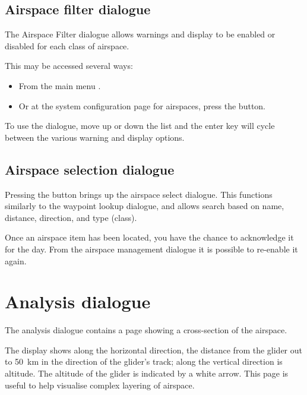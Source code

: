 
\subsection*{Airspace filter dialogue}\label{sec:airspace-filter}

The Airspace Filter dialogue allows warnings and display to be enabled
or disabled for each class of airspace.  

This may be accessed several ways:
\begin{itemize}
\item From the main menu \blink{}.
\item Or at the system configuration page for airspaces, press the  button.
\end{itemize}

To use the dialogue, move up or down the list and the enter key will
cycle between the various warning and display options.

\subsection*{Airspace selection dialogue}

Pressing the  button brings up the airspace select dialogue.
This functions similarly to the waypoint lookup dialogue, and allows
search based on name, distance, direction, and type (class).  

Once an airspace item has been located, you have the chance to acknowledge it
for the day.  From the
airspace management dialogue it is possible to re-enable it again.


\section{Analysis dialogue}

The analysis dialogue contains a page showing a cross-section of the
airspace. 

The display shows along the horizontal direction, the
distance from the glider out to 50~km in the direction of the glider's
track; along the vertical direction is altitude.  The altitude of the
glider is indicated by a white arrow.  This page is useful to help
visualise complex layering of airspace.

